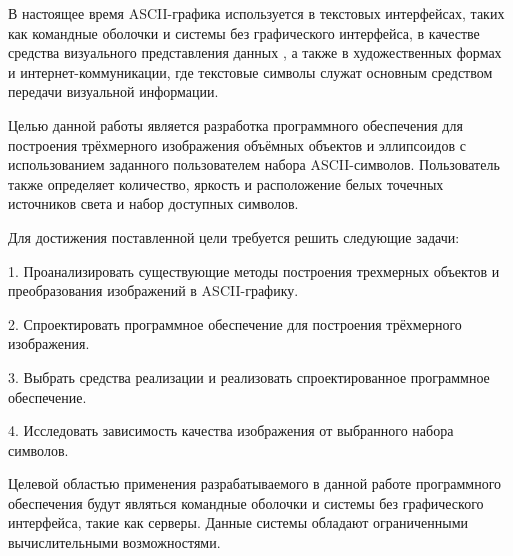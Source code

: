 
В настоящее время ASCII-графика используется в текстовых интерфейсах, таких как командные оболочки и системы без графического интерфейса, в качестве средства визуального представления данных \cite{TUI}, а также в художественных формах и интернет-коммуникации, где текстовые символы служат основным средством передачи визуальной информации. \cite{Future}

Целью данной работы является разработка программного обеспечения для построения трёхмерного изображения объёмных объектов и эллипсоидов с использованием заданного пользователем набора ASCII-символов. Пользователь также определяет количество, яркость и расположение белых точечных источников света и набор доступных символов.

Для достижения поставленной цели требуется решить следующие задачи:

1. Проанализировать существующие методы построения трехмерных объектов и преобразования изображений в ASCII-графику.

2. Спроектировать программное обеспечение для построения трёхмерного изображения.

3. Выбрать средства реализации и реализовать спроектированное программное обеспечение.

4. Исследовать зависимость качества изображения от выбранного набора символов.

Целевой областью применения разрабатываемого в данной работе программного обеспечения будут являться командные оболочки и системы без графического интерфейса, такие как серверы. Данные системы обладают ограниченными вычислительными возможностями.

\clearpage
